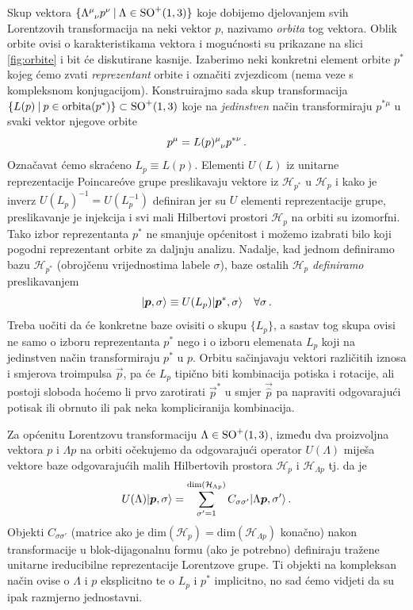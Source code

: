 Skup vektora $\{ \tensor{\Lambda}{^\mu_\nu}p^{\nu} \: | \: \Lambda \in \SOsup{+}{1,3}\}$
koje dobijemo djelovanjem svih Lorentzovih transformacija na neki
vektor $p$, nazivamo \emph{orbita} tog vektora. Oblik orbite ovisi o karakteristikama
vektora i mogućnosti su prikazane na slici \ref{fig:orbite} i bit će diskutirane kasnije.
Izaberimo neki konkretni element orbite $p^{*}$ kojeg ćemo zvati
\emph{reprezentant} orbite i označiti zvjezdicom (nema veze s kompleksnom konjugacijom).
Konstruirajmo sada skup transformacija 
$\{L(p) \: | \: p \in \mathrm{orbita}(p^*) \} \subset \mathrm{SO}^{+}(1,3)$ koje
na \emph{jedinstven} način transformiraju $p^{*\mu}$ u svaki vektor njegove orbite
\begin{equation}
p^{\mu} = \tensor{L(p)}{^\mu_\nu} p^{*\nu}\,.
\end{equation}
Označavat ćemo skraćeno $L_{p} \equiv L(p)$.
Elementi $U(L)$ iz unitarne reprezentacije Poincare\'{o}ve grupe
preslikavaju vektore iz $\mathcal{H}_{p^*}$ u $\mathcal{H}_{p}$
i kako je inverz $U(L_{p})^{-1} = U(L_{p}^{-1})$ definiran jer
su $U$ elementi reprezentacije grupe, preslikavanje je injekcija i
svi mali Hilbertovi prostori $\mathcal{H}_{p}$ na orbiti su 
izomorfni. Tako izbor reprezentanta $p^*$ ne smanjuje općenitost
i možemo izabrati bilo koji pogodni reprezentant orbite za daljnju
analizu. Nadalje, kad jednom definiramo bazu  $\mathcal{H}_{p^*}$
(obrojčenu vrijednostima labele $\sigma$), baze ostalih $\mathcal{H}_{p}$
\emph{definiramo} preslikavanjem
\begin{equation}
\ket{\vec{p}, \sigma} \equiv U(L_{p}) \ket{\vec{p}^*, \sigma} \quad \forall \sigma \,.
    \label{eq:defbazaHp}
\end{equation}
Treba uočiti da će konkretne baze ovisiti o skupu $\{L_{p}\}$, a
sastav tog skupa ovisi ne samo o izboru reprezentanta $p^*$ nego i
o izboru elemenata $L_p$ koji na jedinstven način transformiraju
$p^*$ u $p$. Orbitu sačinjavaju vektori različitih iznosa i smjerova
troimpulsa $\vec{p}$,
pa će $L_p$ tipično biti kombinacija potiska i rotacije, ali postoji
sloboda hoćemo li prvo zarotirati $\vec{p}^*$ u smjer $\vec{\hat{p}}$ pa 
napraviti odgovarajući potisak ili obrnuto ili pak neka kompliciranija kombinacija.

Za općenitu Lorentzovu transformaciju $\Lambda \in \mathrm{SO}^{+}(1,3)$,
između dva proizvoljna vektora $p$ i $\Lambda p$ na orbiti očekujemo 
da odgovarajući operator $U(\Lambda)$ miješa vektore baze
odgovarajućih malih Hilbertovih prostora $\mathcal{H}_{p}$
i $\mathcal{H}_{\Lambda p}$ tj. da je  
\begin{equation}
    U(\Lambda) \ket{\vec{p}, \sigma} = \sum_{\sigma'=1}^{\mathrm{dim}(\mathcal{H}_{\Lambda p})}
    C_{\sigma \sigma'} \ket{\Lambda\vec{p}, \sigma'} \,.
\end{equation}
Objekti $C_{\sigma \sigma'}$ (matrice ako je $\mathrm{dim}(\mathcal{H}_{p}) =
\mathrm{dim}(\mathcal{H}_{\Lambda p})$ konačno)
nakon transformacije u blok-dijagonalnu
formu (ako je potrebno) definiraju tražene unitarne ireducibilne reprezentacije
Lorentzove grupe. Ti objekti na kompleksan način ovise o $\Lambda$ i
$p$ eksplicitno te o $L_{p}$ i $p^*$ implicitno,
no sad ćemo vidjeti da su ipak razmjerno jednostavni.

